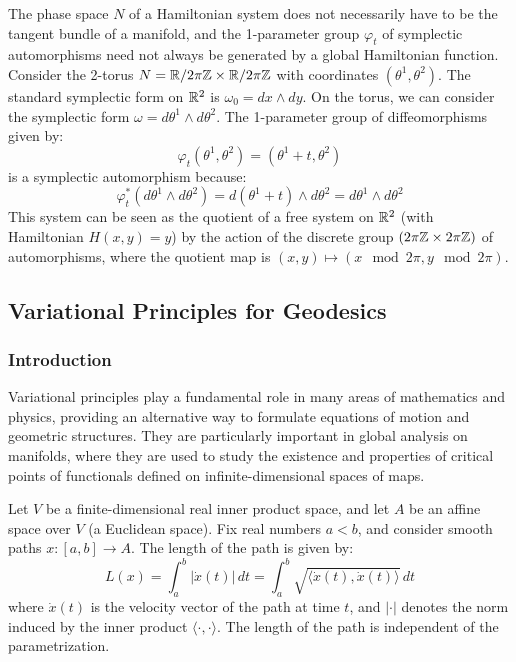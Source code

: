\begin{example}
The phase space $N$ of a Hamiltonian system does not necessarily have to be the tangent bundle of a manifold, and the 1-parameter group $\varphi_t$ of symplectic automorphisms need not always be generated by a global Hamiltonian function. Consider the 2-torus $N = \mathbb{R} / 2\pi\mathbb{Z} \times \mathbb{R} / 2\pi\mathbb{Z}$ with coordinates $(\theta^1, \theta^2)$. The standard symplectic form on $\mathbb{R}^2$ is $\omega_0 = dx \wedge dy$. On the torus, we can consider the symplectic form $\omega = d\theta^1 \wedge d\theta^2$. The 1-parameter group of diffeomorphisms given by:
\[ \varphi_t(\theta^1, \theta^2) = (\theta^1 + t, \theta^2) \]
is a symplectic automorphism because:
\[ \varphi_t^* (d\theta^1 \wedge d\theta^2) = d(\theta^1 + t) \wedge d\theta^2 = d\theta^1 \wedge d\theta^2 \]
This system can be seen as the quotient of a free system on $\mathbb{R}^2$ (with Hamiltonian $H(x, y) = y$) by the action of the discrete group $(2\pi\mathbb{Z} \times 2\pi\mathbb{Z})$ of automorphisms, where the quotient map is $(x, y) \mapsto (x \mod 2\pi, y \mod 2\pi)$.
\end{example}

\subsection{Variational Principles for Geodesics}

\subsubsection{Introduction}

Variational principles play a fundamental role in many areas of mathematics and physics, providing an alternative way to formulate equations of motion and geometric structures. They are particularly important in global analysis on manifolds, where they are used to study the existence and properties of critical points of functionals defined on infinite-dimensional spaces of maps.

Let $V$ be a finite-dimensional real inner product space, and let $A$ be an affine space over $V$ (a Euclidean space). Fix real numbers $a < b$, and consider smooth paths $x: [a, b] \rightarrow A$. The length of the path is given by:
\[ L(x) = \int_a^b |\dot{x}(t)| \, dt = \int_a^b \sqrt{\langle \dot{x}(t), \dot{x}(t) \rangle} \, dt \]
where $\dot{x}(t)$ is the velocity vector of the path at time $t$, and $|\cdot|$ denotes the norm induced by the inner product $\langle \cdot, \cdot \rangle$. The length of the path is independent of the parametrization.

